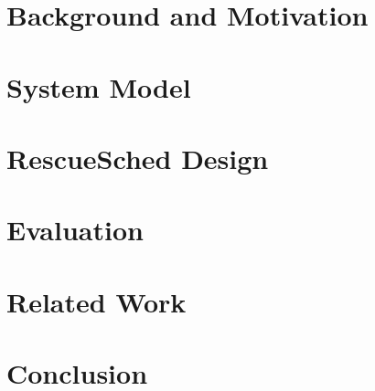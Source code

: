 \documentclass[conference]{IEEEtran}
\begin{document}
\section{Background and Motivation}
\label{sec:background}


\section{System Model}
\label{sec:model}


\section{RescueSched Design}
\label{sec:design}


\section{Evaluation}
\label{sec:eval}


\section{Related Work}
\label{sec:related}


\section{Conclusion}
\label{sec:conclusion}




\end{document}

